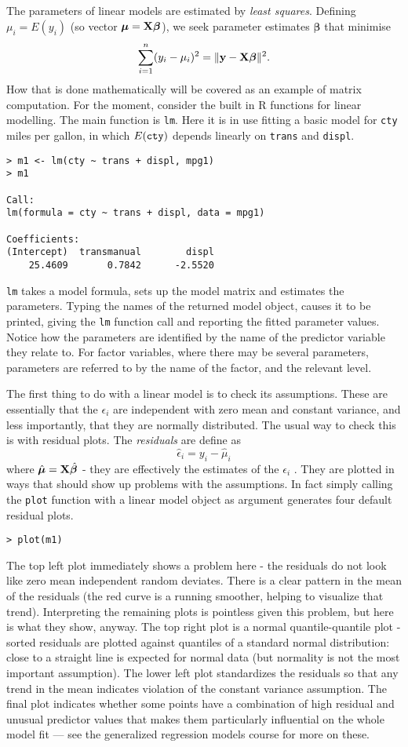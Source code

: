 \documentclass[10pt] {article}
\newcommand{\bp}{{\vm \beta}}
\newcommand{\X}{{\vf X}}
\newcommand{\vf}{\bf} %
\newcommand{\vm}{\bm} %
\newcommand{\eps}[3]
{{\begin{center}
 \rotatebox{#1}{\scalebox{#2}{\texttt{[image: \#3]}}}
 \end{center}}
}
\theoremstyle{definition}
\begin{document}
The parameters of linear models are estimated by {\em least squares}. Defining $\mu_i = E(y_i)$ (so vector ${\bm \mu} = \X\bp$), we seek parameter estimates $\hat \bp$ that minimise 
$$
\sum_{i=1}^n (y_i -\mu_i)^2 = \|{\bf y} - \X \bp\|^2.
$$  
How that is done mathematically will be covered as an example of matrix computation. For the moment, consider the built in R functions for linear modelling. The main function is {\tt lm}. Here it is in use fitting a basic model for {\tt cty} miles per gallon, in which $E({\tt cty})$ depends linearly on {\tt trans} and {\tt displ}.
\begin{lstlisting}
> m1 <- lm(cty ~ trans + displ, mpg1)
> m1

Call:
lm(formula = cty ~ trans + displ, data = mpg1)

Coefficients:
(Intercept)  transmanual        displ  
    25.4609       0.7842      -2.5520 
\end{lstlisting}    
{\tt lm} takes a model formula, sets up the model matrix and estimates the parameters. Typing the names of the returned model object, causes it to be printed, giving the {\tt lm} function call and reporting the fitted parameter values. Notice how the parameters are identified by the name of the predictor variable they relate to. For factor variables, where there may be several parameters, parameters are referred to by the name of the factor, and the relevant level. 

The first thing to do with a linear model is to check its assumptions. These are essentially that the $\epsilon_i$ are independent with zero mean and constant variance, and less importantly, that they are normally distributed. The usual way to check this is with residual plots. The {\em residuals} are define as 
$$
\hat \epsilon_i = y_i - \hat \mu_i
$$
where $\hat {\bm \mu} = \X \hat \bp$ - they are effectively the estimates of the $\epsilon_i$ . They are plotted in ways that should show up problems with the assumptions. In fact simply calling the {\tt plot} function with a linear model object as argument generates four default residual plots. 
\begin{lstlisting}
> plot(m1)
\end{lstlisting}
\eps{-90}{.5}{mpg-check1.eps}  
The top left plot immediately shows a problem here - the residuals do not look like zero mean independent random deviates. There is a clear pattern in the mean of the residuals (the red curve is a running smoother, helping to visualize that trend). Interpreting the remaining plots is pointless given this problem, but here is what they show, anyway. The top right plot is a normal quantile-quantile plot - sorted residuals are plotted against quantiles of a standard normal distribution: close to a straight line is expected for normal data (but normality is not the most important assumption). The lower left plot standardizes the residuals so that any trend in the mean indicates violation of the constant variance assumption. The final plot indicates whether some points have a combination of high residual and unusual predictor values that makes them particularly influential on the whole model fit --- see the generalized regression models course for more on these. 
\end{document}
